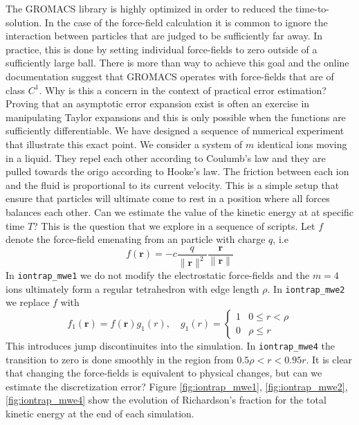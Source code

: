 \documentclass[runningheads]{llncs}
\begin{document}
The GROMACS library is highly optimized in order to reduced the time-to-solution. In the case of the force-field calculation it is common to ignore the interaction between particles that are judged to be sufficiently far away. In practice, this is done by setting individual force-fields to zero outside of a sufficiently large ball. There is more than way to achieve this goal and the online documentation suggest that GROMACS operates with force-fields that are of class $C^1$. Why is this a concern in the context of practical error estimation? Proving that an asymptotic error expansion exist is often an exercise in manipulating Taylor expansions and this is only possible when the functions are sufficiently differentiable. We have designed a sequence of numerical experiment that illustrate this exact point. We consider a system of $m$ identical ions moving in a liquid. They repel each other according to Coulumb's law and they are pulled towards the origo according to Hooke's law. The friction between each ion and the fluid is proportional to its current velocity. This is a simple setup that ensure that particles will ultimate come to rest in a position where all forces balances each other. Can we estimate the value of the kinetic energy at at specific time $T$? This is the question that we explore in a sequence of scripts. Let $f$ denote the force-field emenating from an particle with charge $q$, i.e
\begin{equation}
  f(\bm{r}) = - c \frac{q}{\|\bm{r}\|^2} \frac{\bm{r}}{\|\bm{r}\|}
\end{equation}
In {\tt iontrap\_mwe1} we do not modify the electrostatic force-fields and the $m=4$ ions ultimately form a regular tetrahedron with edge length $\rho$. In {\tt iontrap\_mwe2} we replace $f$ with
\begin{equation}
  f_1(\bm{r}) = f(\bm{r}) g_1(r), \quad g_1(r) = \begin{cases} 1  & 0 \leq r < \rho \\ 0 & \rho \leq r \end{cases}
\end{equation}
This introduces jump discontinuites into the simulation. In {\tt iontrap\_mwe4} the transition to zero is done smoothly in the region from $0.5 \rho < r < 0.95 r$. It is clear that changing the force-fields is equivalent to physical changes, but can we estimate the discretization error? Figure \ref{fig:iontrap_mwe1}, \ref{fig:iontrap_mwe2}, \ref{fig:iontrap_mwe4} show the evolution of Richardson's fraction for the total kinetic energy at the end of each simulation.
\end{document}
